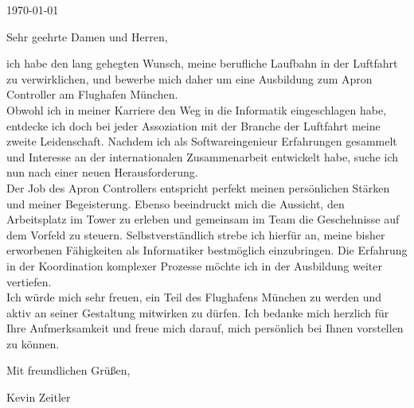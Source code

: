 \documentclass[10pt, a4paper]{article}
\begin{document}
\makeprofile %

\makecontact %

\today %

\makeemployerinfo %

Sehr geehrte Damen und Herren,

ich habe den lang gehegten Wunsch, meine berufliche Laufbahn in der Luftfahrt zu verwirklichen,
und bewerbe mich daher um eine Ausbildung zum Apron Controller am Flughafen München.
\\Obwohl ich in meiner Karriere den Weg in die Informatik eingeschlagen habe,
entdecke ich doch bei jeder Assoziation mit der Branche der Luftfahrt meine zweite Leidenschaft.
Nachdem ich als Softwareingenieur Erfahrungen gesammelt und Interesse an der internationalen Zusammenarbeit
entwickelt habe, suche ich nun nach einer neuen Herausforderung.
\\Der Job des Apron Controllers entspricht perfekt meinen persönlichen Stärken und meiner Begeisterung.
Ebenso beeindruckt mich die Aussicht, den Arbeitsplatz im Tower zu erleben und gemeinsam im Team die Geschehnisse auf dem Vorfeld zu steuern.
Selbstverständlich strebe ich hierfür an, meine bisher erworbenen Fähigkeiten als Informatiker bestmöglich einzubringen.
Die Erfahrung in der Koordination komplexer Prozesse möchte ich in der Ausbildung weiter vertiefen.
\\Ich würde mich sehr freuen, ein Teil des Flughafens München zu werden und aktiv an seiner Gestaltung mitwirken zu dürfen.
Ich bedanke mich herzlich für Ihre Aufmerksamkeit und freue mich darauf, mich persönlich bei Ihnen vorstellen zu können.




Mit freundlichen Grüßen,

Kevin Zeitler
\end{document}
